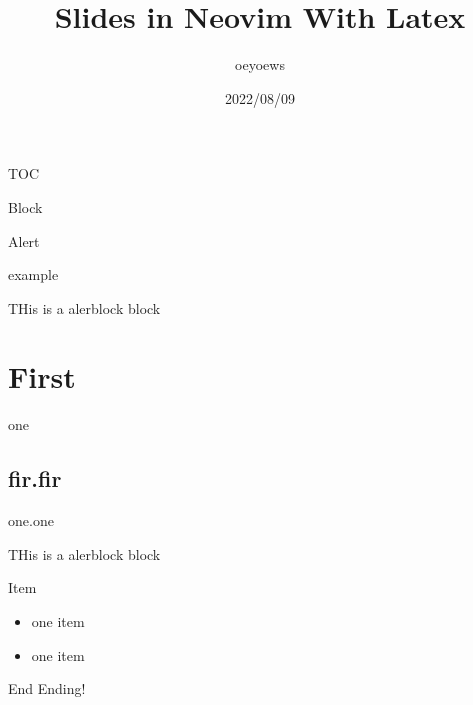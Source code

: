 \documentclass{beamer}
\title{Slides in Neovim With Latex}
\author{oeyoews}
\date{2022/08/09}
\begin{document}
\begin{frame}[plain]
  \titlepage
\end{frame}

\begin{frame}{TOC}
  \tableofcontents
\end{frame}

\begin{frame}{Block}

  \begin{alertblock}{Alert}

  \end{alertblock}

  \begin{exampleblock}{example}

    THis is a alerblock block

  \end{exampleblock}

  \section{First}%
  \label{sec:First}
  one

  \subsection{fir.fir}%
  \label{sub:fir.fir}
  one.one

  THis is a alerblock block

\end{frame}


\begin{frame}{Item}

  \begin{itemize}
    \item  one item
    \item  one item
  \end{itemize}

\end{frame}

\begin{frame}{End}
  Ending!
\end{frame}
\end{document}
